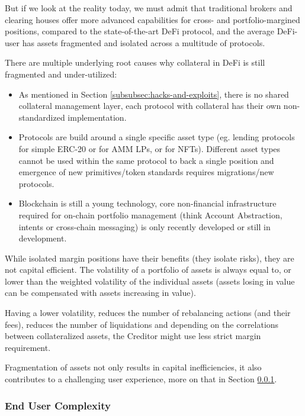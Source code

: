 \documentclass[sigconf,nonacm]{acmart}
\begin{document}
But if we look at the reality today, we must admit that traditional brokers and clearing houses offer more advanced capabilities for cross- and portfolio-margined positions,
compared to the state-of-the-art DeFi protocol,
and the average DeFi-user has assets fragmented and isolated across a multitude of protocols.

There are multiple underlying root causes why collateral in DeFi is still fragmented and under-utilized:
\begin{itemize}
    \item As mentioned in Section \ref{subsubsec:hacks-and-exploits},
    there is no shared collateral management layer, each protocol with collateral has their own non-standardized implementation.
    \item Protocols are build around a single specific asset type (eg. lending protocols for simple ERC-20 or for AMM LPs, or for NFTs). 
    Different asset types cannot be used within the same protocol to back a single position and emergence of new primitives/token standards requires migrations/new protocols.
    \item Blockchain is still a young technology, core non-financial infrastructure required for on-chain portfolio management
    (think Account Abstraction, intents or cross-chain messaging) is only recently developed or still in development. 
\end{itemize}

While isolated margin positions have their benefits (they isolate risks), they are not capital efficient.
The volatility of a portfolio of assets is always equal to, or lower than the weighted volatility of the individual assets
(assets losing in value can be compensated with assets increasing in value).

Having a lower volatility, reduces the number of rebalancing actions (and their fees), reduces the number of liquidations
and depending on the correlations between collateralized assets, the Creditor might use less strict margin requirement.

Fragmentation of assets not only results in capital inefficiencies, it also contributes to a challenging user experience,
more on that in Section \ref{subsubsec:end-user-complexity}.

\subsubsection{End User Complexity}
\label{subsubsec:end-user-complexity}
\end{document}

